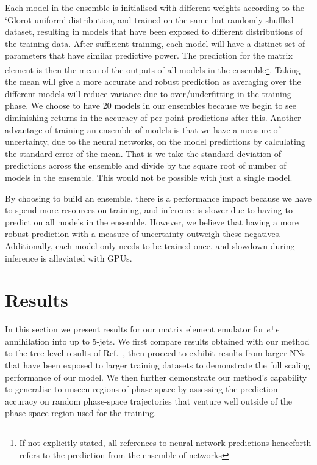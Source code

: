 \documentclass[main.tex]{subfiles}
\begin{document}
Each model in the ensemble is initialised with different weights according to the `Glorot uniform' distribution, and trained on the same but randomly shuffled dataset, resulting in models that have been exposed to different distributions of the training data.
After sufficient training, each model will have a distinct set of parameters that have similar predictive power.
The prediction for the matrix element is then the mean of the outputs of all models in the ensemble\footnote{If not explicitly stated, all references to neural network predictions henceforth refers to the prediction from the ensemble of networks}.
Taking the mean will give a more accurate and robust prediction as averaging over the different models will reduce variance due to over/underfitting in the training phase.
We choose to have 20 models in our ensembles because we begin to see diminishing returns in the accuracy of per-point predictions after this.
Another advantage of training an ensemble of models is that we have a measure of uncertainty, due to the neural networks, on the model predictions by calculating the standard error of the mean.
That is we take the standard deviation of predictions across the ensemble and divide by the square root of number of models in the ensemble. This would not be possible with just a single model.

By choosing to build an ensemble, there is a performance impact because we have to spend more resources on training, and inference is slower due to having to predict on all models in the ensemble.
However, we believe that having a more robust prediction with a measure of uncertainty outweigh these negatives.
Additionally, each model only needs to be trained once, and slowdown during inference is alleviated with GPUs. 

\section{Results}\label{sec:results}
In this section we present results for our matrix element emulator for $e^{+}e^{-}$ annihilation into up to 5-jets.
We first compare results obtained with our method to the tree-level results of Ref.~\cite{Badger:2020uow}, then proceed to exhibit results from larger NNs
that have been exposed to larger training datasets to demonstrate the full scaling performance of our model.
We then further demonstrate our method's capability to generalise to unseen regions of phase-space by assessing the prediction accuracy on random phase-space trajectories that venture well outside of the phase-space region used for the training.
\end{document}
